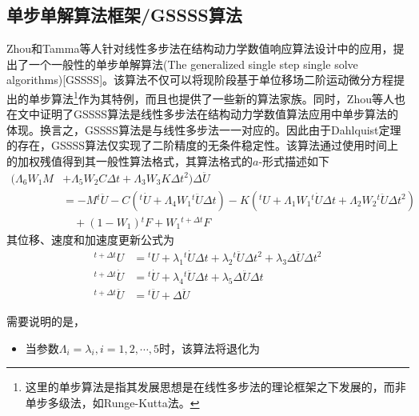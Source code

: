 \subsection{单步单解算法框架/GSSSS算法}
Zhou和Tamma等人针对线性多步法在结构动力学数值响应算法设计中的应用，提出了一个一般性的单步单解算法\cite{Zhou2004c}(The generalized single step single solve algorithms)[GSSSS]。该算法不仅可以将现阶段基于单位移场二阶运动微分方程提出的单步算法\footnote{这里的单步算法是指其发展思想是在线性多步法的理论框架之下发展的，而非单步多级法，如Runge-Kutta法。}作为其特例，而且也提供了一些新的算法家族。同时，Zhou等人也在文中证明了GSSSS算法是线性多步法在结构动力学数值算法应用中单步算法的体现。换言之，GSSSS算法是与线性多步法一一对应的。因此由于Dahlquist定理\cite{Dahlquist1963}的存在，GSSSS算法仅实现了二阶精度的无条件稳定性。该算法通过使用时间上的加权残值得到其一般性算法格式，其算法格式的$a$-形式描述如下
\begin{equation}
\begin{aligned}
(\Lambda_6W_1M&+\Lambda_5W_2C\Delta t+\Lambda_3W_3K\Delta t^2)\Delta\ddot{U}\\
&=-M{^t\!\ddot{U}}-C({^t\!\dot{U}}+\Lambda_4W_1{^t\!\ddot{U}}\Delta t)-K({^t\!U}+\Lambda_1W_1{^t\!\dot{U}\Delta t+\Lambda_2W_2{^t\!\ddot{U}}}\Delta t^2)\\
&\quad+(1-W_1){^t\!F}+W_1{^{t+\Delta t}\!F}
\end{aligned}
\end{equation}
其位移、速度和加速度更新公式为
\begin{subequations}
\begin{align}
{^{t+\Delta t}\!U}&={^t\!U}+\lambda_1{^t\!\dot{U}}\Delta t+\lambda_2{^t\!\ddot{U}}\Delta t^2+\lambda_3\Delta\ddot{U}\Delta t^2\\
{^{t+\Delta t}\!\dot{U}}&={^t\!\dot{U}}+\lambda_4{^t\!\ddot{U}}\Delta t+\lambda_5\Delta \ddot{U}\Delta t\\
{^{t+\Delta t}\!\ddot{U}}&={^t\!\ddot{U}}+\Delta\ddot{U}
\end{align}
\end{subequations}

需要说明的是，\begin{itemize}
\item[\ddag] 当参数$\Lambda_i=\lambda_i,i=1,2,\cdots,5$时，该算法将退化为
\end{itemize}












